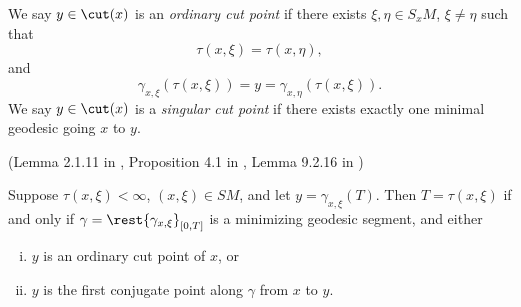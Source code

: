 We say $y\in\cut(x)$ is an \textit{ordinary cut point} if there exists $\xi,\eta\in S_xM$, $\xi\neq\eta$ such that
$$\tau(x,\xi)=\tau(x,\eta),$$
and
$$\gamma_{x,\xi}(\tau(x,\xi))=y=\gamma_{x,\eta}(\tau(x,\xi)).$$
We say $y\in\cut(x)$ is a \textit{singular cut point} if there exists exactly one minimal geodesic going $x$ to $y$.
\begin{thm}(Lemma 2.1.11 in \cite{klingenberg1995riemannian}, Proposition 4.1 in \cite{sakai1996riemannian}, Lemma 9.2.16 in \cite{petersen2006riemannian})\label{thm:klingLemma}
    
    Suppose $\tau(x,\xi)<\infty$, $(x,\xi)\in SM$, and let $y=\gamma_{x,\xi}(T)$.  Then $T=\tau(x,\xi)$ if and only if $\gamma=\rest{\gamma_{x,\xi}}_{[0,T]}$ is a minimizing geodesic segment, and either
    \begin{enumerate}[i.]
    \item $y$ is an ordinary cut point of $x$, or
    \item $y$ is the first conjugate point along $\gamma$ from $x$ to $y$.	
    \end{enumerate}

\end{thm}

